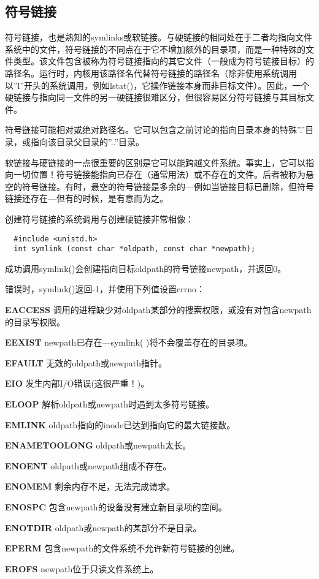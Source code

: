 \subsection{符号链接}

符号链接，也是熟知的symlinks或软链接。与硬链接的相同处在于二者均指向文件系统中的文件，符号链接的不同点在于它不增加额外的目录项，而是一种特殊的文件类型。该文件包含被称为符号链接指向的其它文件（一般成为符号链接目标）的路径名。运行时，内核用该路径名代替符号链接的路径名（除非使用系统调用以''l''开头的系统调用，例如lstat()，它操作链接本身而非目标文件）。因此，一个硬链接与指向同一文件的另一硬链接很难区分，但很容易区分符号链接与其目标文件。

符号链接可能相对或绝对路径名。它可以包含之前讨论的指向目录本身的特殊''.''目录，或指向该目录父目录的''..''目录。

软链接与硬链接的一点很重要的区别是它可以能跨越文件系统。事实上，它可以指向一切位置！符号链接能指向已存在（通常用法）或不存在的文件。后者被称为悬空的符号链接。有时，悬空的符号链接是多余的—例如当链接目标已删除，但符号链接还存在—但有的时候，是有意而为之。

创建符号链接的系统调用与创建硬链接非常相像：

\begin{lstlisting}
  #include <unistd.h>
  int symlink (const char *oldpath, const char *newpath);
\end{lstlisting}

成功调用symlink()会创建指向目标oldpath的符号链接newpath，并返回0。

错误时，symlink()返回-1，并使用下列值设置errno：

\begin{eqlist*}
\item[\textbf{EACCESS}] 调用的进程缺少对oldpath某部分的搜索权限，或没有对包含newpath的目录写权限。
\item[\textbf{EEXIST}] newpath已存在—symlink( )将不会覆盖存在的目录项。
\item[\textbf{EFAULT}] 无效的oldpath或newpath指针。
\item[\textbf{EIO}] 发生内部I/O错误(这很严重！)。
\item[\textbf{ELOOP}] 解析oldpath或newpath时遇到太多符号链接。
\item[\textbf{EMLINK}] oldpath指向的inode已达到指向它的最大链接数。
\item[\textbf{ENAMETOOLONG}] oldpath或newpath太长。
\item[\textbf{ENOENT}] oldpath或newpath组成不存在。
\item[\textbf{ENOMEM}] 剩余内存不足，无法完成请求。
\item[\textbf{ENOSPC}] 包含newpath的设备没有建立新目录项的空间。
\item[\textbf{ENOTDIR}] oldpath或newpath的某部分不是目录。
\item[\textbf{EPERM}] 包含newpath的文件系统不允许新符号链接的创建。
\item[\textbf{EROFS}] newpath位于只读文件系统上。
\end{eqlist*}

